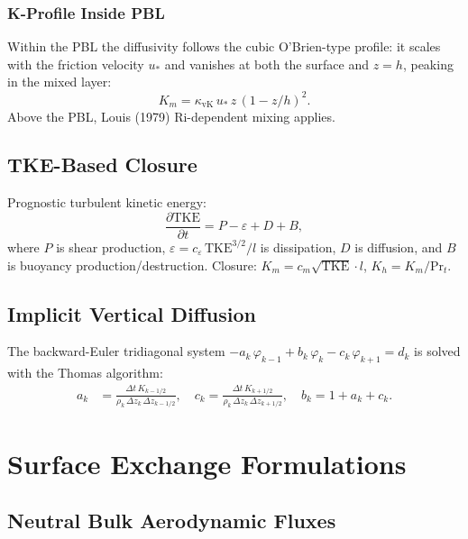 \documentclass[11pt,twoside]{report}
\newcommand{\pp}{\partial}
\begin{document}
\subsubsection{K-Profile Inside PBL}

Within the PBL the diffusivity follows the cubic O'Brien-type profile: it
scales with the friction velocity $u_*$ and vanishes at both the surface and
$z=h$, peaking in the mixed layer:
\begin{equation}
  K_m = \kappa_{\mathrm{vK}}\,u_*\,z\,(1-z/h)^2.
\end{equation}
Above the PBL, Louis (1979) Ri-dependent mixing applies.

\subsection{TKE-Based Closure}

Prognostic turbulent kinetic energy:
\begin{equation}
  \frac{\pp\mathrm{TKE}}{\pp t} = P - \varepsilon + D + B,
\end{equation}
where $P$ is shear production, $\varepsilon=c_\varepsilon\,\mathrm{TKE}^{3/2}/l$
is dissipation, $D$ is diffusion, and $B$ is buoyancy production/destruction.
Closure: $K_m = c_m\sqrt{\mathrm{TKE}}\cdot l$, $K_h = K_m/\mathrm{Pr}_t$.

\subsection{Implicit Vertical Diffusion}

The backward-Euler tridiagonal system
$-a_k\,\varphi_{k-1}+b_k\,\varphi_k-c_k\,\varphi_{k+1}=d_k$ is solved
with the Thomas algorithm:
\begin{align}
  a_k &= \frac{\Delta t\,K_{k-1/2}}{\rho_k\,\Delta z_k\,\Delta z_{k-1/2}},
  \quad c_k = \frac{\Delta t\,K_{k+1/2}}{\rho_k\,\Delta z_k\,\Delta z_{k+1/2}},
  \quad b_k = 1+a_k+c_k.
\end{align}


\section{Surface Exchange Formulations}
\label{sec:surface}

\subsection{Neutral Bulk Aerodynamic Fluxes}
\end{document}
